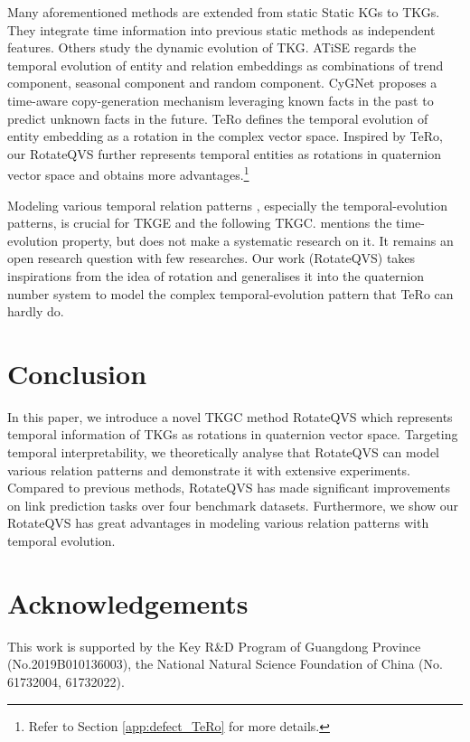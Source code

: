 \documentclass[11pt]{article}
\begin{document}
Many aforementioned methods \cite{dasgupta2018hyte,leblay2018deriving,trivedi2017know,garcia2018learning,goel2020diachronic,ChronoR} are extended from static Static KGs to TKGs. They integrate time information into previous static methods as independent features. Others study the dynamic evolution of TKG. ATiSE \cite{xu2019temporal} regards the temporal evolution of entity and relation embeddings as combinations of trend component, seasonal component and random component.
CyGNet \cite{ZhuCFCZ21} proposes a time-aware copy-generation mechanism leveraging known facts in the past to predict unknown facts in the future.
TeRo \cite{xu2020tero} defines the temporal evolution of entity embedding as a rotation in the complex vector space.
Inspired by TeRo, our RotateQVS further represents temporal entities as rotations in quaternion vector space and obtains more advantages.\footnote{Refer to Section \ref{app:defect_TeRo} for more details.}

Modeling various temporal relation patterns \cite{goel2020diachronic,xu2020tero}, especially the temporal-evolution patterns, is crucial for TKGE and the following TKGC.
\citeauthor{zhang2021spatial} mentions the time-evolution property, but does not make a systematic research on it.
It remains an open research question with few researches.
Our work (RotateQVS) takes inspirations from the idea of rotation and generalises it into the quaternion number system to model the complex temporal-evolution pattern that TeRo can hardly do.


\section{Conclusion}
In this paper, we introduce a novel TKGC method RotateQVS which represents temporal information of TKGs as rotations in quaternion vector space. Targeting temporal interpretability, we theoretically analyse that RotateQVS can model various relation patterns and demonstrate it with extensive experiments.
Compared to previous methods, RotateQVS has made significant improvements on link prediction tasks over four benchmark datasets.
Furthermore, we show our RotateQVS has great advantages in modeling various relation patterns with temporal evolution.



\section*{Acknowledgements}
This work is supported by the Key R\&D Program of Guangdong  Province (No.2019B010136003), the National Natural Science Foundation of China (No. 61732004, 61732022).
\end{document}
